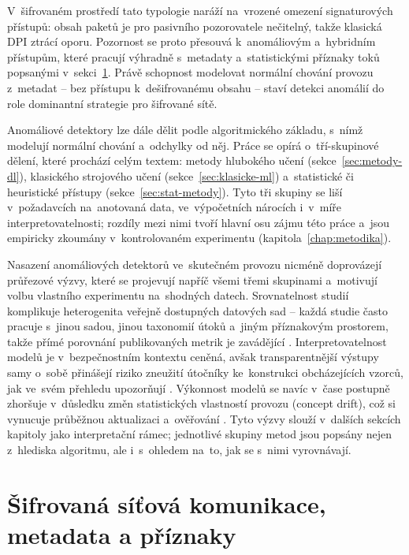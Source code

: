 V~šifrovaném prostředí tato typologie naráží na~vrozené omezení signaturových přístupů: obsah paketů je pro pasivního pozorovatele nečitelný, takže klasická DPI ztrácí oporu. Pozornost se proto přesouvá k~anomáliovým a~hybridním přístupům, které pracují výhradně s~metadaty a~statistickými příznaky toků popsanými v~sekci~\ref{sec:sifrovana-komunikace}. Právě schopnost modelovat normální chování provozu z~metadat -- bez přístupu k~dešifrovanému obsahu -- staví detekci anomálií do role dominantní strategie pro šifrované sítě.

Anomáliové detektory lze dále dělit podle algoritmického základu, s~nímž modelují normální chování a~odchylky od něj. Práce se opírá o~tří-skupinové dělení, které prochází celým textem: metody hlubokého učení (sekce~\ref{sec:metody-dl}), klasického strojového učení (sekce~\ref{sec:klasicke-ml}) a~statistické či heuristické přístupy (sekce~\ref{sec:stat-metody}). Tyto tři skupiny se liší v~požadavcích na~anotovaná data, ve~výpočetních nárocích i~v~míře interpretovatelnosti; rozdíly mezi nimi tvoří hlavní osu zájmu této práce a~jsou empiricky zkoumány v~kontrolovaném experimentu (kapitola~\ref{chap:metodika}).

Nasazení anomáliových detektorů ve~skutečném provozu nicméně doprovázejí průřezové výzvy, které se projevují napříč všemi třemi skupinami a~motivují volbu vlastního experimentu na~shodných datech. Srovnatelnost studií komplikuje heterogenita veřejně dostupných datových sad -- každá studie často pracuje s~jinou sadou, jinou taxonomií útoků a~jiným příznakovým prostorem, takže přímé porovnání publikovaných metrik je zavádějící \parencite{Ji2024}. Interpretovatelnost modelů je v~bezpečnostním kontextu ceněná, avšak transparentnější výstupy samy o~sobě přinášejí riziko zneužití útočníky ke~konstrukci obcházejících vzorců, jak ve~svém přehledu upozorňují \textcite{Capuano2022}. Výkonnost modelů se navíc v~čase postupně zhoršuje v~důsledku změn statistických vlastností provozu (concept drift), což si vynucuje průběžnou aktualizaci a~ověřování \parencite{Qing2025}. Tyto výzvy slouží v~dalších sekcích kapitoly jako interpretační rámec; jednotlivé skupiny metod jsou popsány nejen z~hlediska algoritmu, ale i~s~ohledem na~to, jak se s~nimi vyrovnávají.

\section{Šifrovaná síťová komunikace, metadata a příznaky}
\label{sec:sifrovana-komunikace}

